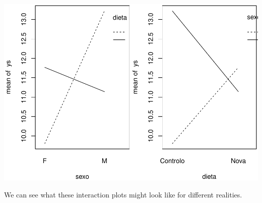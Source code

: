 \documentclass[
]{book}
\begin{document}
\includegraphics{ECOMODbook_files/figure-latex/a11.1-2.pdf}

We can see what these interaction plots might look like for different realities.
\end{document}

